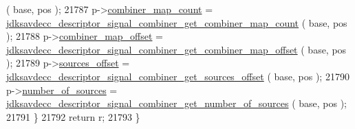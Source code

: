\begin{DoxyCode}
      ( base, pos );
21787         p->\hyperlink{structjdksavdecc__descriptor__signal__combiner_af34fb15a884222f9ffe5dd2d22e4e701}{combiner\_map\_count} = 
      \hyperlink{group__descriptor__signal__combiner_gadd2493df0c6bf2a2d504206a637e1903}{jdksavdecc\_descriptor\_signal\_combiner\_get\_combiner\_map\_count}
      ( base, pos );
21788         p->\hyperlink{structjdksavdecc__descriptor__signal__combiner_abc173ec56f2573ff69cf569647ddcfe8}{combiner\_map\_offset} = 
      \hyperlink{group__descriptor__signal__combiner_ga963a17fce7f7ebbf44a22e78faff4e69}{jdksavdecc\_descriptor\_signal\_combiner\_get\_combiner\_map\_offset}
      ( base, pos );
21789         p->\hyperlink{structjdksavdecc__descriptor__signal__combiner_ac9ce4e1b642e6654d49504898dbe738d}{sources\_offset} = 
      \hyperlink{group__descriptor__signal__combiner_ga5e4ca098c26ca924f806e96c4aa8b2d5}{jdksavdecc\_descriptor\_signal\_combiner\_get\_sources\_offset}
      ( base, pos );
21790         p->\hyperlink{structjdksavdecc__descriptor__signal__combiner_a1af3a7f3729937d5da218737ba5b2483}{number\_of\_sources} = 
      \hyperlink{group__descriptor__signal__combiner_ga00d18de5a7f4a9d44cb3948e12cc5f00}{jdksavdecc\_descriptor\_signal\_combiner\_get\_number\_of\_sources}
      ( base, pos );
21791     \}
21792     \textcolor{keywordflow}{return} r;
21793 \}
\end{DoxyCode}


